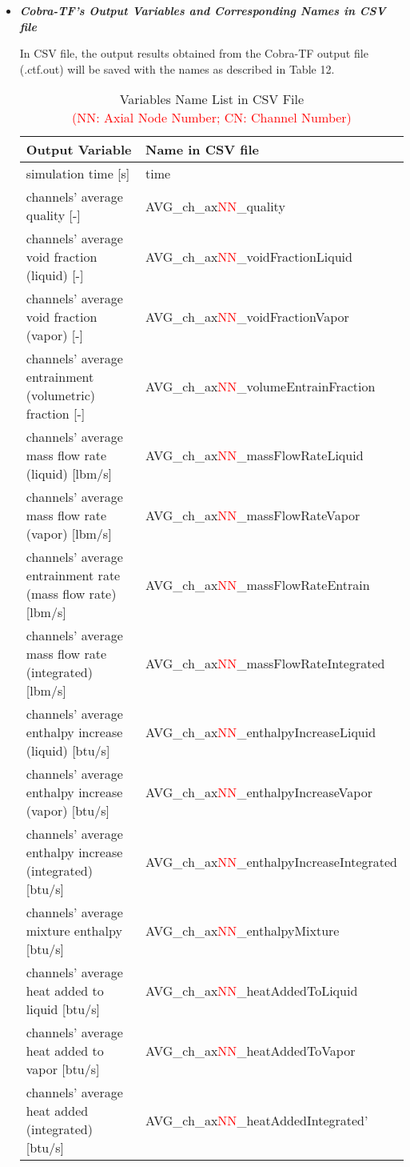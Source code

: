 \begin{itemize}
 \item \textit{\textbf{Cobra-TF's Output Variables and Corresponding Names in CSV file}}
   
   In CSV file, the output results obtained from the Cobra-TF output file (.ctf.out) will be saved with the names as described in Table 12.
   \begin{table}[h]
    \centering
    \caption[caption]{Variables Name List in CSV File \\\hspace{\textwidth} \textcolor{red}{(NN: Axial Node Number; CN: Channel Number)}}
    \label{CSVvariableNames}
    \tabcolsep=0.11cm
    \scriptsize
    \begin{tabular}{|l|l|}
     \hline
     \textbf{Output Variable} & \textbf{Name in CSV file} \\  \hline
     simulation time [s] & time   \\
     channels' average quality [-] & AVG\_ch\_ax\textcolor{red}{NN}\_quality \\
     channels' average void fraction (liquid) [-] & AVG\_ch\_ax\textcolor{red}{NN}\_voidFractionLiquid \\
     channels' average void fraction (vapor) [-] & AVG\_ch\_ax\textcolor{red}{NN}\_voidFractionVapor \\
     channels' average entrainment (volumetric) fraction [-] & AVG\_ch\_ax\textcolor{red}{NN}\_volumeEntrainFraction \\
     channels' average mass flow rate (liquid) [lbm/s] & AVG\_ch\_ax\textcolor{red}{NN}\_massFlowRateLiquid \\
     channels' average mass flow rate (vapor) [lbm/s] & AVG\_ch\_ax\textcolor{red}{NN}\_massFlowRateVapor \\
     channels' average entrainment rate (mass flow rate) [lbm/s] & AVG\_ch\_ax\textcolor{red}{NN}\_massFlowRateEntrain \\
     channels' average mass flow rate (integrated) [lbm/s] & AVG\_ch\_ax\textcolor{red}{NN}\_massFlowRateIntegrated \\
     channels' average enthalpy increase (liquid) [btu/s] & AVG\_ch\_ax\textcolor{red}{NN}\_enthalpyIncreaseLiquid \\
     channels' average enthalpy increase (vapor) [btu/s] & AVG\_ch\_ax\textcolor{red}{NN}\_enthalpyIncreaseVapor \\
     channels' average enthalpy increase (integrated) [btu/s] & AVG\_ch\_ax\textcolor{red}{NN}\_enthalpyIncreaseIntegrated \\
     channels' average mixture enthalpy [btu/s] & AVG\_ch\_ax\textcolor{red}{NN}\_enthalpyMixture \\
     channels' average heat added to liquid [btu/s] & AVG\_ch\_ax\textcolor{red}{NN}\_heatAddedToLiquid \\
     channels' average heat added to vapor [btu/s] & AVG\_ch\_ax\textcolor{red}{NN}\_heatAddedToVapor \\
     channels' average heat added (integrated) [btu/s] & AVG\_ch\_ax\textcolor{red}{NN}\_heatAddedIntegrated' \\


\end{tabular}
\end{table}
\end{itemize}
